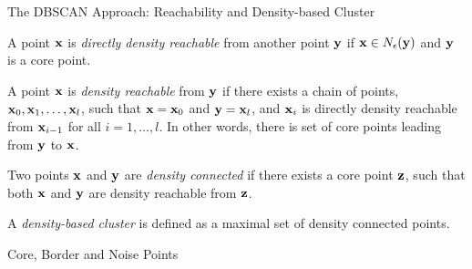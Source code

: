 \begin{frame}{The DBSCAN Approach: Reachability and Density-based
  Cluster}

  A point $\mathbf{x}$ is {\em directly density reachable}
from another point $\mathbf{y}$ if $\mathbf{x} \in N_{\epsilon}(\mathbf{y})$ and
$\mathbf{y}$ is a core point. 

\medskip
A point $\mathbf{x}$ is {\em density
    reachable} from $\mathbf{y}$ if there exists a chain of points,
$\mathbf{x}_0, \mathbf{x}_1, \ldots, \mathbf{x}_l$, such that
$\mathbf{x} = \mathbf{x}_0$ and $\mathbf{y} = \mathbf{x}_l$, and
$\mathbf{x}_i$ is
directly density reachable from $\mathbf{x}_{i-1}$ for all $i=1,\ldots,l$.
In other words,
there is set of core points leading from $\mathbf{y}$ to $\mathbf{x}$.

\medskip
Two points $\mathbf{x}$ and $\mathbf{y}$ are
{\em density connected}
if there exists a core point $\mathbf{z}$,
such that both $\mathbf{x}$ and $\mathbf{y}$ are density reachable from $\mathbf{z}$.

\medskip
A {\em density-based cluster} is def\/{i}ned as a maximal set of
density connected points.
\end{frame}


\begin{frame}[fragile]{Core, Border and Noise Points}
\begin{figure}[!ht]%
  \centerline{
  \hspace{1in}
  }
\end{figure}
\end{frame}


